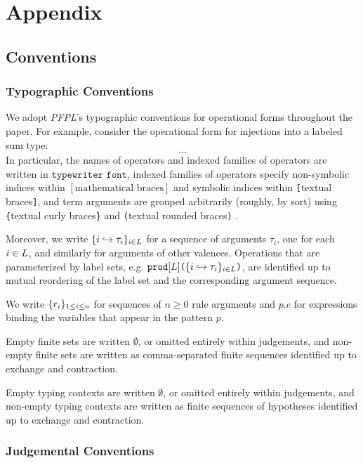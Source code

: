 \part{Appendix}

\appendix
\chapter{Conventions}
\section{Typographic Conventions}\label{appendix:typographic-conventions}
We adopt \emph{PFPL}'s typographic conventions for operational forms throughout the paper. For example, consider the operational form for injections into a labeled sum type:
\[... 
\]
In particular, the names of operators and indexed families of operators are written in $\texttt{typewriter font}$, indexed families of operators specify non-symbolic indices within $[\text{mathematical braces}]$ and symbolic indices within \texttt{[}textual braces\texttt{]}, and term arguments are grouped arbitrarily (roughly, by sort) using \texttt{\{}textual curly braces\texttt{\}} and \texttt{(}textual rounded braces\texttt{)} \cite{pfpl}. 

Moreover, we write $\{i \hookrightarrow \tau_{i}\}_{i \in L}$ for a sequence of arguments $\tau_i$, one for each $i\in L$, and similarly for arguments of other valences. Operations  that are parameterized by label sets, e.g. $\texttt{prod}[L]\texttt{(}\{i \hookrightarrow \tau_{i}\}_{i \in L}\texttt{)}$, are identified up to mutual reordering of the label set and the corresponding argument sequence. 

We write $\{r_{i}\}_{1 \leq i \leq n}$ for sequences of $n \geq 0$ rule arguments and $p.e$ for expressions binding the variables that appear in the pattern $p$.


Empty finite sets are written $\emptyset$, or omitted entirely within judgements, and non-empty finite sets are written as comma-separated finite sequences identified up to exchange and contraction. 

Empty typing contexts are written $\emptyset$, or omitted entirely within judgements, and non-empty typing contexts are written as finite sequences of hypotheses identified up to exchange and contraction. 


\section{Judgemental Conventions}\label{appendix:judgemental-conventions}

